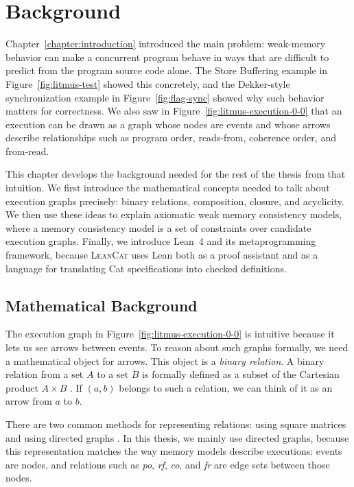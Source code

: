 \chapter{Background}
\label{chapter:Background}

Chapter~\ref{chapter:introduction} introduced the main problem: weak-memory behavior can make a concurrent program behave in ways that are difficult to predict from the program source code alone. The Store Buffering example in Figure~\ref{fig:litmus-test} showed this concretely, and the Dekker-style synchronization example in Figure~\ref{fig:flag-sync} showed why such behavior matters for correctness. We also saw in Figure~\ref{fig:litmus-execution-0-0} that an execution can be drawn as a graph whose nodes are events and whose arrows describe relationships such as program order, reads-from, coherence order, and from-read.

This chapter develops the background needed for the rest of the thesis from that intuition. We first introduce the mathematical concepts needed to talk about execution graphs precisely: binary relations, composition, closure, and acyclicity. We then use these ideas to explain axiomatic weak memory consistency models, where a memory consistency model is a set of constraints over candidate execution graphs. Finally, we introduce Lean~4 and its metaprogramming framework, because \textsc{LeanCat} uses Lean both as a proof assistant and as a language for translating Cat specifications into checked definitions.

\section{Mathematical Background}
\label{sec:math-background}

The execution graph in Figure~\ref{fig:litmus-execution-0-0} is intuitive because it lets us see arrows between events. To reason about such graphs formally, we need a mathematical object for arrows. This object is a \emph{binary relation}. A binary relation from a set $A$ to a set $B$ is formally defined as a subset of the Cartesian product $A \times B$ \citep[p.~599]{rosen2012discrete}. If $(a,b)$ belongs to such a relation, we can think of it as an arrow from $a$ to $b$.

There are two common methods for representing relations: using square matrices and using directed graphs \citep[p.~621]{rosen2012discrete}. In this thesis, we mainly use directed graphs, because this representation matches the way memory models describe executions: events are nodes, and relations such as \textit{po}, \textit{rf}, \textit{co}, and \textit{fr} are edge sets between those nodes.

